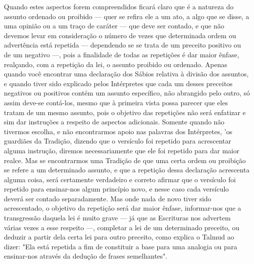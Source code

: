 \begin{itemize}
\begin{enumrate}
Quando estes aspectos forem compreendidos ficará claro que é a na­tureza
do assunto ordenado ou proibido --- quer se refira ele a um ato, a algo
que se disse, a uma opinião ou a um traço de caráter --- que deve ser
contado, e que não devemos levar em consideração o número de vezes que
determina­da ordem ou advertência está repetida --- dependendo se se
trata de um precei­to positivo ou de um negativo ---, pois a finalidade
de todas as repetições é dar maior ênfase, realçando, com a repetição da
lei, o assunto proibido ou ordena­do. Apenas quando você encontrar uma
declaração dos Sábios relativa à divi­são dos assuntos, e quando tiver
sido explicado pelos Intérpretes que cada um desses preceitos negativos
ou positivos contém um assunto específico, não abrangido pelo outro, só
assim deve-se contá-los, mesmo que à primeira vista possa parecer que
eles tratam de um mesmo assunto, pois o objetivo das repe­tições não
será enfatizar e sim dar instruções a respeito de aspectos adicionais.
Somente quando não tivermos escolha, e não encontrarmos apoio nas
palavras dos Intérpretes, 'os guardiães da Tradição, dizendo que o
versículo foi repetido para acrescentar alguma instrução, diremos
necessariamente que ele foi repeti­do para dar maior realce. Mas se
encontrarmos uma Tradição de que uma certa ordem ou proibição se refere
a um determinado assunto, e que a repetição des­sa declaração acrescenta
alguma coisa, será certamente verdadeiro e correto afir­mar que o
versículo foi repetido para ensinar-nos algum princípio novo, e nes­se
caso cada versículo deverá ser contado separadamente. Mas onde nada de
novo tiver sido acrescentado, o objetivo da repetição será dar maior
ênfase, informar-nos que a transgressão daquela lei é muito grave --- já
que as Escritu­ras nos advertem várias vezes a esse respeito ---,
completar a lei de um determi­nado preceito, ou deduzir a partir dela
certa lei para outro preceito, como ex­plica o Talmud ao dizer: "Ela
está repetida a fim de constituir a base para uma analogia ou para
ensinar-nos através da dedução de frases semelhantes".


\end{enumrate}
\end{itemize}
